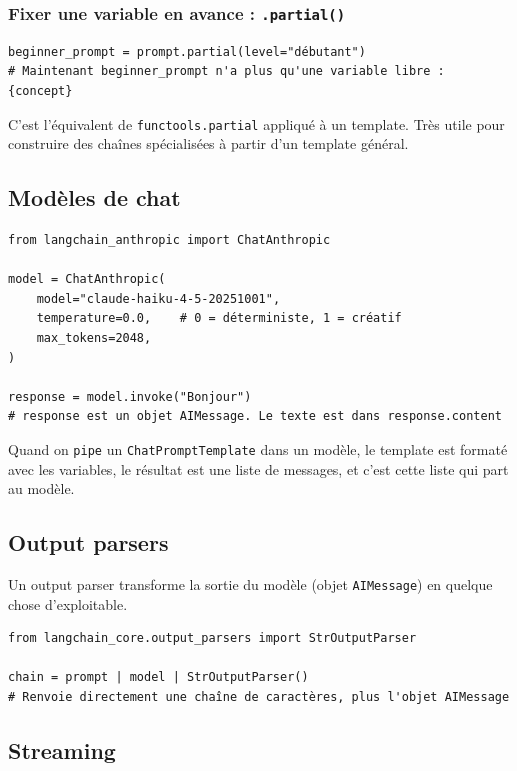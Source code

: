 \documentclass[11pt,a4paper]{article}
\begin{document}
\subsubsection*{Fixer une variable en avance : \texttt{.partial()}}

\begin{verbatim}
beginner_prompt = prompt.partial(level="débutant")
# Maintenant beginner_prompt n'a plus qu'une variable libre : {concept}
\end{verbatim}

C'est l'équivalent de \texttt{functools.partial} appliqué à un template. Très utile pour construire des chaînes spécialisées à partir d'un template général.

\subsection{Modèles de chat}

\begin{verbatim}
from langchain_anthropic import ChatAnthropic

model = ChatAnthropic(
    model="claude-haiku-4-5-20251001",
    temperature=0.0,    # 0 = déterministe, 1 = créatif
    max_tokens=2048,
)

response = model.invoke("Bonjour")
# response est un objet AIMessage. Le texte est dans response.content
\end{verbatim}

Quand on \texttt{pipe} un \texttt{ChatPromptTemplate} dans un modèle, le template est formaté avec les variables, le résultat est une liste de messages, et c'est cette liste qui part au modèle.

\subsection{Output parsers}

Un output parser transforme la sortie du modèle (objet \texttt{AIMessage}) en quelque chose d'exploitable.

\begin{verbatim}
from langchain_core.output_parsers import StrOutputParser

chain = prompt | model | StrOutputParser()
# Renvoie directement une chaîne de caractères, plus l'objet AIMessage
\end{verbatim}

\subsection{Streaming}
\end{document}
